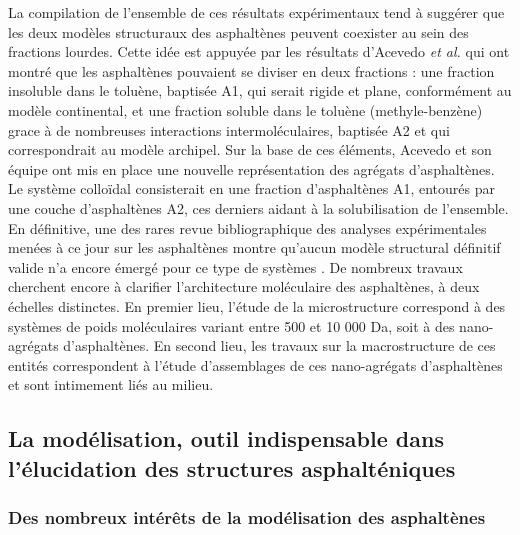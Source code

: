 La compilation de l'ensemble de ces résultats expérimentaux tend à suggérer que les deux modèles structuraux des asphaltènes peuvent coexister au sein des fractions lourdes. Cette idée est appuyée par les résultats d'Acevedo \textit{et al.} \cite{acevedo2004structural, gutierrez2001fractionation} qui ont montré que les asphaltènes pouvaient se diviser en deux fractions : une fraction insoluble dans le toluène, baptisée A1, qui serait rigide et plane, conformément au modèle continental, et une fraction soluble dans le toluène (methyle-benzène) grace à de nombreuses interactions intermoléculaires, baptisée A2 et qui correspondrait au modèle archipel. Sur la base de ces éléments, Acevedo et son équipe ont mis en place une nouvelle représentation des agrégats d'asphaltènes. Le système colloïdal consisterait en une fraction d'asphaltènes A1, entourés par une couche d'asphaltènes A2, ces derniers aidant à la solubilisation de l'ensemble. \\
En définitive, une des rares revue bibliographique des analyses expérimentales menées à ce jour sur les asphaltènes montre qu'aucun modèle structural définitif valide n'a encore émergé pour ce type de systèmes \cite{speight2004petroleum}. De nombreux travaux cherchent encore à clarifier l'architecture moléculaire des asphaltènes, à deux échelles distinctes. En premier lieu, l'étude de la microstructure correspond à des systèmes de poids moléculaires variant entre 500 et 10 000 Da, soit à des nano-agrégats d'asphaltènes. En second lieu, les travaux sur la macrostructure de ces entités correspondent à l'étude d'assemblages de ces nano-agrégats d'asphaltènes et sont intimement liés au milieu. 



\subsection{La modélisation, outil indispensable dans l'élucidation des structures asphalténiques}

\subsubsection{Des nombreux intérêts de la modélisation des asphaltènes}

